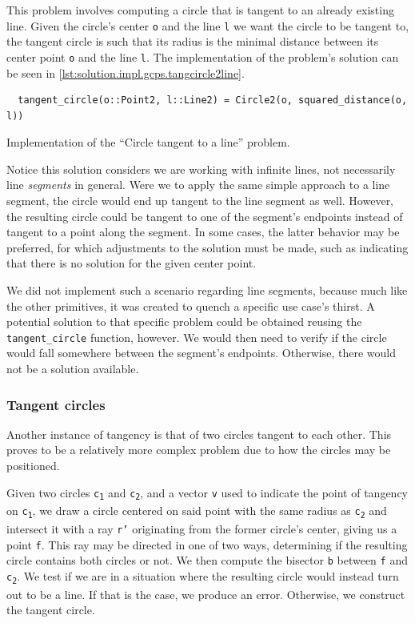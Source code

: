 This problem involves computing a circle that is tangent to an already existing
line.  Given the circle's center \texttt{o} and the line \texttt{l} we want the
circle to be tangent to, the tangent circle is such that its radius is the
minimal distance between its center point \texttt{o} and the line \texttt{l}.
The implementation of the problem's solution can be seen in
\cref{lst:solution.impl.gcps.tangcircle2line}.

\begin{listing}[htb]
  \begin{verbatim}
  tangent_circle(o::Point2, l::Line2) = Circle2(o, squared_distance(o, l))
  \end{verbatim}
  \caption[Circle tangent to a line]{
    Implementation of the ``Circle tangent to a line'' problem.}%
  \label{lst:solution.impl.gcps.tangcircle2line}
\end{listing}

Notice this solution considers we are working with infinite lines, not
necessarily line \textit{segments} in general.  Were we to apply the same simple
approach to a line segment, the circle would end up tangent to the line segment
as well.  However, the resulting circle could be tangent to one of the segment's
endpoints instead of tangent to a point along the segment.  In some cases, the
latter behavior may be preferred, for which adjustments to the solution must be
made, such as indicating that there is no solution for the given center point.

We did not implement such a scenario regarding line segments, because much like
the other primitives, it was created to quench a specific use case's thirst.  A
potential solution to that specific problem could be obtained reusing the
\texttt{tangent\_circle} function, however.  We would then need to verify if the
circle would fall somewhere between the segment's endpoints.  Otherwise, there
would not be a solution available.

\subsubsection{Tangent circles}%
\label{sec:solution.impl.gcps.tangentcircles}

Another instance of tangency is that of two circles tangent to each other.  This
proves to be a relatively more complex problem due to how the circles may be
positioned.

Given two circles \texttt{c\textsubscript{1}} and \texttt{c\textsubscript{2}},
and a vector \texttt{v} used to indicate the point of tangency on
\texttt{c\textsubscript{1}}, we draw a circle centered on said point with the
same radius as \texttt{c\textsubscript{2}} and intersect it with a ray
\texttt{r'} originating from the former circle's center, giving us a point
\texttt{f}.  This ray may be directed in one of two ways, determining if the
resulting circle contains both circles or not.  We then compute the bisector
\texttt{b} between \texttt{f} and \texttt{c\textsubscript{2}}.  We test if we
are in a situation where the resulting circle would instead turn out to be a
line.  If that is the case, we produce an error.  Otherwise, we construct the
tangent circle.

